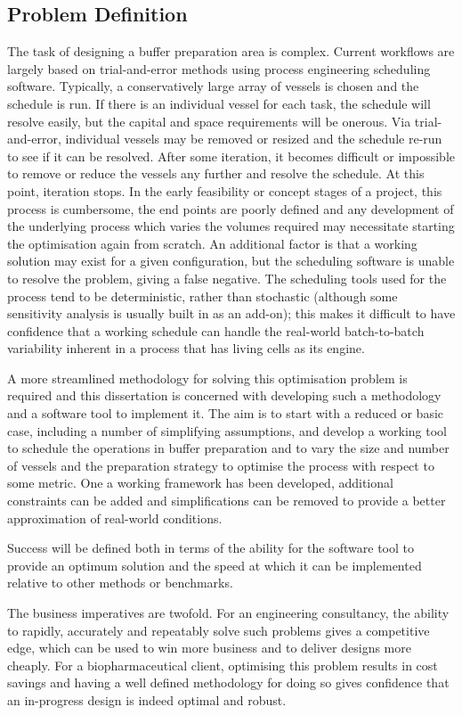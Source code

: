 \subsection{Problem Definition}\label{SS.probdef}

The task of designing a buffer preparation area is complex.
Current workflows are largely based on trial-and-error methods using process
engineering scheduling software.  
Typically, a conservatively large array of vessels is chosen and the schedule
is run.  
If there is an individual vessel for each task, the schedule will resolve
easily, but the capital and space requirements will be onerous.
Via trial-and-error, individual vessels may be removed or resized and
the schedule re-run to see if it can be resolved.  
After some iteration, it becomes difficult or impossible to remove or reduce
the vessels any further and resolve the schedule.
At this point, iteration stops.
In the early feasibility or concept stages of a project, this process is
cumbersome, the end points are poorly defined and any development of the
underlying process which varies the volumes required may necessitate starting
the optimisation again from scratch.
An additional factor is that a working solution may exist for a given
configuration, but the scheduling software is unable to resolve the problem,
giving a false negative. 
The scheduling tools used for the process tend to be deterministic, rather than
stochastic (although some sensitivity analysis is usually built in as an 
add-on); this makes it difficult to have confidence that a working schedule can
handle the real-world batch-to-batch variability inherent in a process that has
living cells as its engine.

A more streamlined methodology for solving this optimisation problem is
required and this dissertation is concerned with developing such a methodology
and a software tool to implement it.
The aim is to start with a reduced or basic case, including a number of
simplifying assumptions, and develop a working tool to schedule the operations
in buffer preparation and to vary the size and number of vessels and the 
preparation strategy to optimise the process with respect to some metric.
One a working framework has been developed, additional constraints can be added
and simplifications can be removed to provide a better approximation of 
real-world conditions.

Success will be defined both in terms of the ability for the software tool to
provide an optimum solution and the speed at which it can be implemented
relative to other methods or benchmarks.

The business imperatives are twofold.
For an engineering consultancy, the ability to rapidly, accurately and
repeatably solve such problems gives a competitive edge, which can be used to
win more business and to deliver designs more cheaply.  For a biopharmaceutical
client, optimising this problem results in cost savings and having a well
defined methodology for doing so gives confidence that an in-progress design is
indeed optimal and robust.

